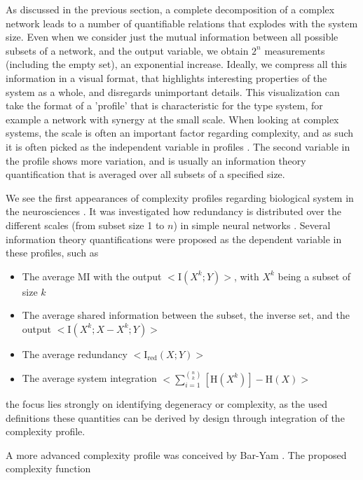 \documentclass[../main.tex]{subfiles}
\begin{document}
As discussed in the previous section, a complete decomposition of a complex network leads to a number of quantifiable relations that explodes with the system size.
Even when we consider just the mutual information between all possible subsets of a network, and the output variable, we obtain $2^n$ measurements (including the empty set), an exponential increase.
Ideally, we compress all this information in a visual format, that highlights interesting properties of the system as a whole, and disregards unimportant details.
This visualization can take the format of a 'profile' that is characteristic for the type system, for example a network with synergy at the small scale.
When looking at complex systems, the scale is often an important factor regarding complexity, and as such it is often picked as the independent variable in profiles \cite{bar2013computationally, quax2017quantifying, tononi1999measures}.
The second variable in the profile shows more variation, and is usually an information theory quantification that is averaged over all subsets of a specified size.

We see the first appearances of complexity profiles regarding biological system in the neurosciences \cite{}.
It was investigated how redundancy is distributed over the different scales (from subset size 1 to $n$) in simple neural networks \cite{tononi1999measures}. 
Several information theory quantifications were proposed as the dependent variable in these profiles, such as

\begin{itemize}
\item The average MI with the output $<\mathrm{I}(X^k;Y)>$, with $X^k$ being a subset of size $k$
\item The average shared information between the subset, the inverse set, and the output  $<\mathrm{I}(X^k;X - X^k;Y)>$
\item The average redundancy $<\mathrm{I}_\mathrm{red}(X;Y)>$
\item The average system integration $<\sum_{i = 1}^{\binom{n}{k}}[\mathrm{H}(X^k)] - \mathrm{H}(X)>$
\end{itemize}

the focus lies strongly on identifying degeneracy or complexity, as the used definitions these quantities can be derived by design through integration of  the complexity profile.

A more advanced complexity profile was conceived by Bar-Yam \cite{bar2004multiscale}.
The proposed complexity function
\end{document}
